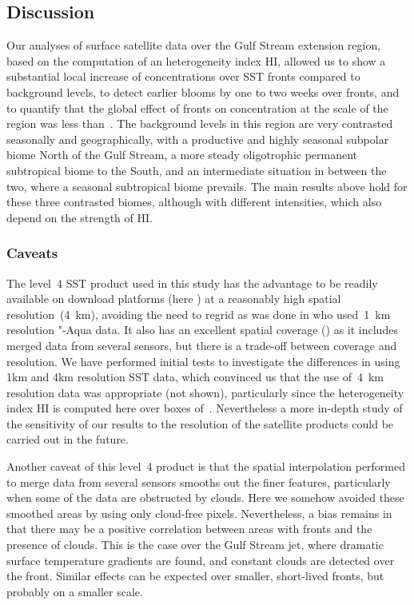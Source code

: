 \subsection{Discussion}

Our analyses of surface satellite data over the Gulf Stream extension region, based on the computation of an heterogeneity index HI, allowed us to show a substantial local increase of  concentrations over SST fronts compared to background levels, to detect earlier blooms by one to two weeks over fronts, and to quantify that the global effect of fronts on  concentration at the scale of the region was less than~.
The background levels in this region are very contrasted seasonally and geographically, with a productive and highly seasonal subpolar biome North of the Gulf Stream, a more steady oligotrophic permanent subtropical biome to the South, and an intermediate situation in between the two, where a seasonal subtropical biome prevails.
The main results above hold for these three contrasted biomes, although with different intensities, which also depend on the strength of HI\@.

\subsubsection{Caveats}

The level~4 SST product used in this study has the advantage to be readily available on download platforms (here ) at a reasonably high spatial resolution~(\qty{4}{\km}), avoiding the need to regrid as was done in \textcite{liu_2016} who used~\qty{1}{\km} resolution  "-Aqua data.
It also has an excellent spatial coverage () as it includes merged data from several sensors, but there is a trade-off between coverage and resolution.
We have performed initial tests to investigate the differences in using 1km and 4km resolution SST data, which convinced us that the use of~\qty{4}{\km} resolution data was appropriate (not shown), particularly since the heterogeneity index HI is computed here over boxes of~.
Nevertheless a more in-depth study of the sensitivity of our results to the resolution of the satellite products could be carried out in the future.

Another caveat of this level~4 product is that the spatial interpolation performed to merge data from several sensors smooths out the finer features, particularly when some of the data are obstructed by clouds.
Here we somehow avoided these smoothed areas by using only cloud-free  pixels.
Nevertheless, a bias remains in that there may be a positive correlation between areas with fronts and the presence of clouds.
This is the case over the Gulf Stream jet, where dramatic surface temperature gradients are found, and constant clouds are detected over the front.
Similar effects can be expected over smaller, short-lived fronts, but probably on a smaller scale.

